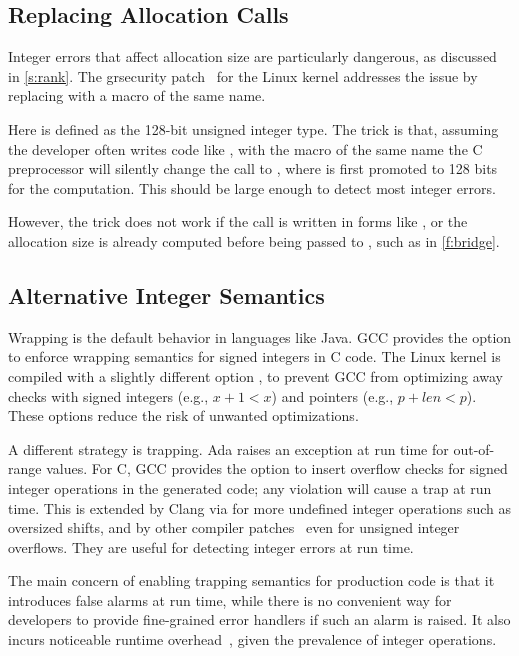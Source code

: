 \subsection{Replacing Allocation Calls}

Integer errors that affect allocation size are particularly dangerous,
as discussed in \autoref{s:rank}.  The grsecurity patch~\cite{grsecurity}
for the Linux kernel addresses the issue by replacing
 with a macro of the same name.
%

%
Here  is defined as the 128-bit unsigned integer
type.  The trick is that, assuming the developer often writes code
like , with the macro of the same name
the C preprocessor will silently change the call to
, where  is first
promoted to 128 bits for the computation.  This should be large
enough to detect most integer errors.

However, the trick does not work if the call is written in forms
like , or the allocation
size is already computed before being passed to , such
as in \autoref{f:bridge}.


\subsection{Alternative Integer Semantics}

Wrapping is the default behavior in languages like Java.
GCC provides the option  to enforce wrapping semantics
for signed integers in C code.  The Linux kernel is compiled with a
slightly different option , to prevent GCC
from optimizing away checks with signed integers (e.g., $x + 1 <
x$) and pointers (e.g., $p + \mathit{len} < p$).
These options reduce the risk of unwanted optimizations.

A different strategy is trapping.  Ada raises an exception at run
time for out-of-range values.  For C, GCC provides the option
 to insert overflow checks for signed integer operations
in the generated code; any violation will cause a trap at run time.
This is extended by Clang via  for
more undefined integer operations such as oversized shifts, and by
other compiler patches~\cite{brumley:rich, ioc} even for unsigned
integer overflows.  They are useful for detecting integer errors
at run time.

The main concern of enabling trapping semantics for production code
is that it introduces false alarms at run time, while there is no
convenient way for developers to provide fine-grained error handlers
if such an alarm is raised.  It also incurs noticeable runtime
overhead~\cite{ioc}, given the prevalence of integer operations.

